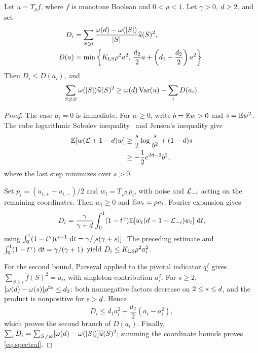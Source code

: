 \begin{lemma}\label{lem:deficit}
Let \(u=T_\rho f\), where \(f\) is monotone Boolean and \(0<\rho<1\).
Let \(\gamma>0\), \(d\ge2\), and set
\begin{align*}
 D_i&=\sum_{S\ni i}
       \frac{\omega(d)-\omega(|S|)}{|S|}\widehat u(S)^2,\\
 D(a)&=\min\left\{K_{\mathrm{LS}}\rho^2a^2,\,
       \frac{d_2}{2}a+\left(d_1-\frac{d_2}{2}\right)a^2\right\}.
\end{align*}
Then \(D_i\le D(a_i)\), and
\begin{equation}
 \sum_{S\ne\varnothing}\omega(|S|)\widehat u(S)^2
 \ge \omega(d)\operatorname{Var}(u)-\sum_iD(a_i).
 \label{eq:spectral}
\end{equation}
\end{lemma}

\begin{proof}
The case \(a_i=0\) is immediate. For \(w\ge0\), write
\(b=\mathbb E w>0\) and \(s=\mathbb E w^2\). The cube logarithmic Sobolev
inequality~\cite{Gross,ODonnell} and Jensen's inequality give
\[
 \begin{aligned}
 \mathbb E[w(\mathcal L+1-d)w]
 &\ge \frac{s}{2}\log\frac{s}{b^2}+(1-d)s\\
 &\ge -\frac12e^{2d-3}b^2,
 \end{aligned}
\]
where the last step minimizes over \(s>0\).

Set \(p_i=(u_{i,+}-u_{i,-})/2\) and \(w_t=T_{\sqrt t}p_i\),
with noise and \(\mathcal L_{-i}\) acting on the remaining coordinates.
Then \(w_t\ge0\) and \(\mathbb E w_t=\rho a_i\).
Fourier expansion gives
\[
 D_i=\frac{\gamma}{\gamma+d}
 \int_0^1(1-t^\gamma)
 \mathbb E[w_t(d-1-\mathcal L_{-i})w_t]\,\,\mathrm d t,
\]
using \(\int_0^1(1-t^\gamma)t^{s-1}\,\,\mathrm d t
=\gamma/[s(\gamma+s)]\).
The preceding estimate and
\(\int_0^1(1-t^\gamma)\,\,\mathrm d t=\gamma/(\gamma+1)\) yield
\(D_i\le K_{\mathrm{LS}}\rho^2a_i^2\).

For the second bound, Parseval applied to the pivotal indicator
\(q_i^f\) gives
\(\sum_{S\ni i}\widehat f(S)^2=a_i\), with singleton contribution
\(a_i^2\). For \(s\ge2\),
\([\omega(d)-\omega(s)]\rho^{2s}\le d_2\):
both nonnegative factors decrease on \(2\le s\le d\),
and the product is nonpositive for \(s>d\). Hence
\[
 D_i\le d_1a_i^2+\frac{d_2}{2}(a_i-a_i^2),
\]
which proves the second branch of \(D(a_i)\).
Finally,
\(\sum_iD_i=\sum_{S\ne\varnothing}
[\omega(d)-\omega(|S|)]\widehat u(S)^2\);
summing the coordinate bounds proves \eqref{eq:spectral}.
\end{proof}


